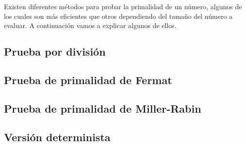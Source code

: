 Existen diferentes métodos para probar la primalidad de un número, algunos de los cuales son más eficientes que otros dependiendo del tamaño del número a evaluar. A continuación vamos a explicar algunos de ellos.

\subsection{Prueba por división}


\subsection{Prueba de primalidad de Fermat}


\subsection{Prueba de primalidad de Miller-Rabin}


\subsection{Versión determinista}

